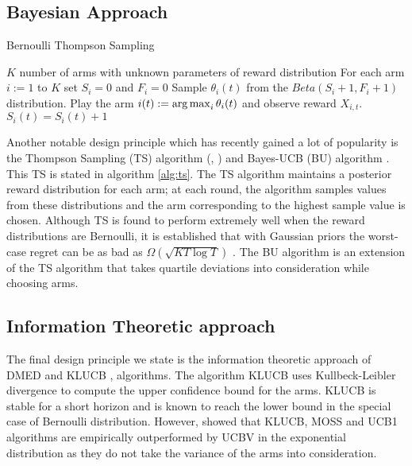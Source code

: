 \subsection{Bayesian Approach}

\begin{algorithm}[!th]
\caption{Bernoulli Thompson Sampling}
\label{alg:ts}
\begin{algorithmic}
 $K$ number of arms with unknown parameters of reward distribution
 For each arm $i:=1$ to $K$ set $S_i =0$ and $F_i =0$
\State {}
\State {}
\State Sample $\theta_{i}(t)$ from the $Beta(S_i+1,F_i+1)$ distribution.
\EndFor
\State Play the arm $i(t):=\operatorname*{arg\,max}_i\theta_i(t)$ and observe reward $X_{i,t}$.
$S_i (t) = S_i (t) + 1$
\EndIf
\EndFor
\end{algorithmic}
\end{algorithm}

    
    Another notable design principle which has recently gained a lot of popularity is the Thompson Sampling (TS) algorithm (\citep{thompson1933likelihood}, \citep{agrawal2011analysis})  and  Bayes-UCB (BU) algorithm \citep{kaufmann2012bayesian}. This TS is stated in algorithm \ref{alg:ts}. The TS algorithm maintains a posterior reward distribution for each arm; at each round, the algorithm samples values from these distributions and the arm corresponding to the highest sample value is chosen. Although TS is found to perform extremely well when the reward distributions are Bernoulli, it is established that with Gaussian priors the worst-case regret can be as bad as $\Omega \left( \sqrt{KT\log T}\right)$ \citep{lattimore2015optimally}. The BU algorithm is an extension of the TS algorithm that takes quartile deviations into consideration while choosing arms.

\subsection{Information Theoretic approach}
    
    The final design principle we state is the information theoretic approach of DMED  \citep{honda2010asymptotically} and KLUCB \citep{garivier2011kl},\citep{cappe2013kullback} algorithms. The algorithm KLUCB uses Kullbeck-Leibler divergence to compute the upper confidence bound for the arms. KLUCB is stable for a short horizon and is known to reach the \citet{lai1985asymptotically} lower bound in the special case of Bernoulli distribution. However, \citet{garivier2011kl} showed that KLUCB, MOSS and UCB1 algorithms are empirically outperformed by UCBV in the exponential distribution as they do not take the variance of the arms into consideration.
    
